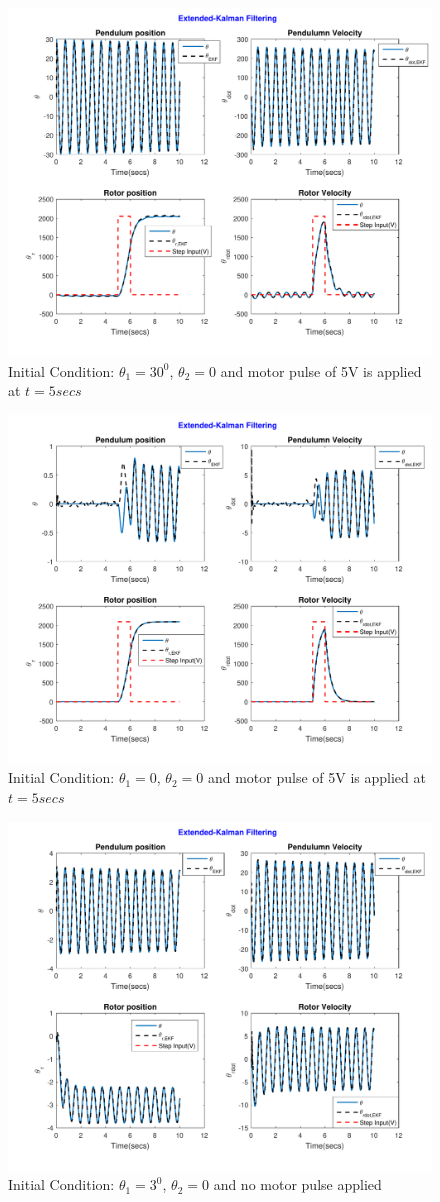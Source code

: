 \documentclass[a4paper]{article}
\begin{document}
\begin{figure}
\centering
\includegraphics[width=0.7\linewidth]{fig/plot_2_ekf1}
\caption{Initial Condition: $\theta_1 = 30^0$, $\theta_2 = 0$ and motor pulse of 5V is applied at $t = 5secs$}
\label{fig:plot_2_ekf1}
\end{figure}
\begin{figure}
\centering
\includegraphics[width=0.7\linewidth]{fig/plot_2_ekf_2}
\caption{Initial Condition: $\theta_1 = 0$, $\theta_2 = 0$ and motor pulse of 5V is applied at $t = 5secs$}
\label{fig:plot_2_ekf_2}
\end{figure}
\begin{figure}
\centering
\includegraphics[width=0.7\linewidth]{fig/plot_2_ekf_3}
\caption{Initial Condition: $\theta_1 = 3^0$, $\theta_2 = 0$ and no motor pulse applied}
\label{fig:plot_2_ekf_3}
\end{figure}
\end{document}
